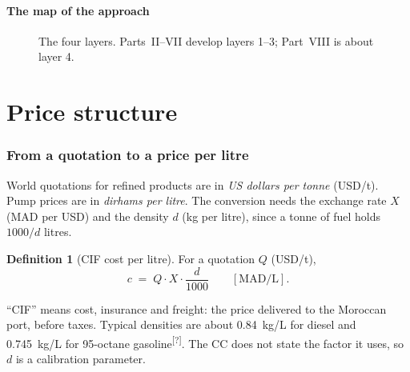 \documentclass[11pt,a4paper]{article}
\newcommand{\tagQ}{\textsuperscript{\textcolor{red!70!black}{\textsf{\scriptsize[?]}}}}
\theoremstyle{definition}
\newtheorem{definition}{Definition}[section]
\newcommand{\MADL}{\text{MAD/L}}
\begin{document}
\subsection{The map of the approach}

\begin{figure}[H]
\centering
{}
\caption{The four layers. Parts~II--VII develop layers 1--3; Part~VIII is about layer 4.}
\end{figure}

\part{Price structure}

\section{From a quotation to a price per litre}

World quotations for refined products are in \emph{US dollars per tonne} (USD/t). Pump prices are
in \emph{dirhams per litre}. The conversion needs the exchange rate $X$ (MAD per USD) and the
density $d$ (kg per litre), since a tonne of fuel holds $1000/d$ litres.

\begin{definition}[CIF cost per litre]
For a quotation $Q$ (USD/t),
\begin{equation}\label{eq:unit}
c \;=\; Q \cdot X \cdot \frac{d}{1000}\qquad [\MADL].
\end{equation}
\end{definition}
``CIF'' means cost, insurance and freight: the price delivered to the Moroccan port, before
taxes. Typical densities are about 0.84~kg/L for diesel and 0.745~kg/L for 95-octane
gasoline\tagQ. The CC does not state the factor it uses, so $d$ is a calibration parameter.
\end{document}
